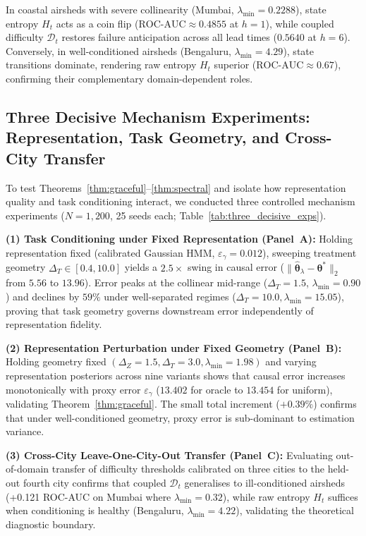 \documentclass[twoside]{article}
\theoremstyle{definition}
\begin{document}
In coastal airsheds with severe collinearity (Mumbai, $\lambda_{\min} = 0.2288$), state entropy $H_t$ acts as a coin flip ($\text{ROC-AUC} \approx 0.4855$ at $h=1$), while coupled difficulty $\mathcal{D}_t$ restores failure anticipation across all lead times ($0.5640$ at $h=6$). Conversely, in well-conditioned airsheds (Bengaluru, $\lambda_{\min} = 4.29$), state transitions dominate, rendering raw entropy $H_t$ superior ($\text{ROC-AUC} \approx 0.67$), confirming their complementary domain-dependent roles.

\subsection{Three Decisive Mechanism Experiments: Representation, Task Geometry, and Cross-City Transfer}
\label{app:three_decisive}
To test Theorems~\ref{thm:graceful}--\ref{thm:spectral} and isolate how representation quality and task conditioning interact, we conducted three controlled mechanism experiments ($N=1,200$, 25 seeds each; Table~\ref{tab:three_decisive_exps}).

\textbf{(1) Task Conditioning under Fixed Representation (Panel~A):} Holding representation fixed (calibrated Gaussian HMM, $\varepsilon_\gamma = 0.012$), sweeping treatment geometry $\Delta_T \in [0.4, 10.0]$ yields a $\mathbf{2.5\times}$ swing in causal error ($\|\hat{\boldsymbol{\theta}}_\lambda - \boldsymbol{\theta}^*\|_2$ from $5.56$ to $13.96$). Error peaks at the collinear mid-range ($\Delta_T=1.5$, $\lambda_{\min}=0.90$) and declines by $59\%$ under well-separated regimes ($\Delta_T=10.0, \lambda_{\min}=15.05$), proving that task geometry governs downstream error independently of representation fidelity.

\textbf{(2) Representation Perturbation under Fixed Geometry (Panel~B):} Holding geometry fixed $(\Delta_Z=1.5, \Delta_T=3.0, \lambda_{\min}=1.98)$ and varying representation posteriors across nine variants shows that causal error increases monotonically with proxy error $\varepsilon_\gamma$ ($13.402$ for oracle to $13.454$ for uniform), validating Theorem~\ref{thm:graceful}. The small total increment ($+0.39\%$) confirms that under well-conditioned geometry, proxy error is sub-dominant to estimation variance.

\textbf{(3) Cross-City Leave-One-City-Out Transfer (Panel~C):} Evaluating out-of-domain transfer of difficulty thresholds calibrated on three cities to the held-out fourth city confirms that coupled $\mathcal{D}_t$ generalises to ill-conditioned airsheds (+0.121 ROC-AUC on Mumbai where $\lambda_{\min}=0.32$), while raw entropy $H_t$ suffices when conditioning is healthy (Bengaluru, $\lambda_{\min}=4.22$), validating the theoretical diagnostic boundary.
\end{document}
